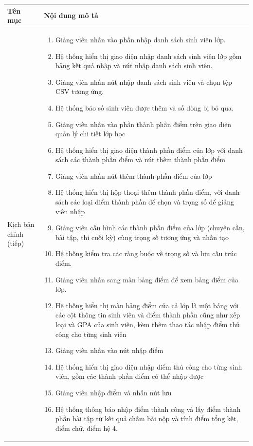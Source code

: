 \documentclass[../BTL.tex]{subfiles}
\begin{document}
\begin{table}[H]
\centering
\begin{tabularx}{\textwidth}{|p{3.2cm}|X|}
\hline
Tên mục & Nội dung mô tả \\ \hline
Kịch bản chính (tiếp) &
\begin{enumerate}[leftmargin=*, nosep, start=9]
    \item Giảng viên nhấn vào phần nhập danh sách sinh viên lớp.
    \item Hệ thống hiển thị giao diện nhập danh sách sinh viên lớp gồm bảng kết quả nhập và nút nhập danh sách sinh viên.
    \item Giảng viên nhấn nút nhập danh sách sinh viên và chọn tệp CSV tương ứng.
    \item Hệ thống báo số sinh viên được thêm và số dòng bị bỏ qua.
    \item Giảng viên nhấn vào phần thành phần điểm trên giao diện quản lý chi tiết lớp học
    \item Hệ thống hiển thị giao diện thành phần điểm của lớp với danh sách các thành phần điểm và nút thêm thành phần điểm
    \item Giảng viên nhấn nút thêm thành phần điểm của lớp
    \item Hệ thống hiển thị hộp thoại thêm thành phần điểm, với danh sách các loại điểm thành phần để chọn và trọng số để giảng viên nhập
    \item Giảng viên cấu hình các thành phần điểm của lớp (chuyên cần, bài tập, thi cuối kỳ) cùng trọng số tương ứng và nhấn tạo
    \item Hệ thống kiểm tra các ràng buộc về trọng số và lưu cấu trúc điểm.
    \item Giảng viên nhấn sang màn bảng điểm để xem bảng điểm của lớp.
    \item Hệ thống hiển thị màn bảng điểm của cả lớp là một bảng với các cột thông tin sinh viên và điểm thành phần cũng như xếp loại và GPA của sinh viên, kèm thêm thao tác nhập điểm thủ công cho từng sinh viên
    \item Giảng viên nhấn vào nút nhập điểm
    \item Hệ thống hiển thị giao diện nhập điểm thủ công cho từng sinh viên, gồm các thành phần điểm có thể nhập được
    \item Giảng viên nhập điểm và nhấn nút lưu
    \item Hệ thống thông báo nhập điểm thành công và lấy điểm thành phần bài tập từ kết quả chấm bài nộp và tính điểm tổng kết, điểm chữ, điểm hệ 4.
\end{enumerate} \\ \hline

\end{tabularx}
\end{table}
\end{document}
